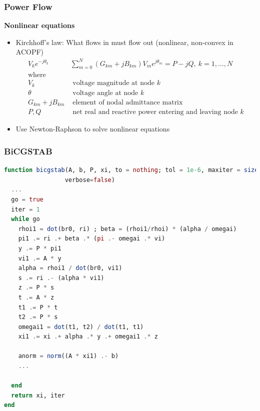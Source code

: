 \begin{frame}[fragile]
  \frametitle{Power Flow}
  {\bf Nonlinear equations}
  \begin{itemize}
      \item Kirchhoff's law: What flows in must flow out (nonlinear, non-convex in ACOPF)
      \begin{align*}
        V_k e^{-j\theta_k} & \sum^{N}_{m=0} (G_{km} + jB_{km})V_m e^{j\theta_m} = P - jQ,\ k = 1, \dots, N \\
        \text{where}\\
        V_k &\text{ voltage magnitude at node } k\\
        \theta &\text{ voltage angle at node } k\\
        G_{km} + jB_{km}& \text{ element of nodal admittance matrix}\\
        P, Q &\text{ net real and reactive power entering and leaving node } k
      \end{align*}
      \item Use Newton-Raphson to solve nonlinear equations
  \end{itemize}
\end{frame}


\begin{frame}[fragile]
  \frametitle{BiCGSTAB}
  \begin{lstlisting}[language=julia, style=jlcodestyle]
function bicgstab(A, b, P, xi, to = nothing; tol = 1e-6, maxiter = size(A,1),
                 verbose=false)
  ...
  go = true
  iter = 1
  while go
    rhoi1 = dot(br0, ri) ; beta = (rhoi1/rhoi) * (alpha / omegai)
    pi1 .= ri .+ beta .* (pi .- omegai .* vi)
    y .= P * pi1
    vi1 .= A * y
    alpha = rhoi1 / dot(br0, vi1)
    s .= ri .- (alpha * vi1)
    z .= P * s
    t .= A * z
    t1 .= P * t
    t2 .= P * s
    omegai1 = dot(t1, t2) / dot(t1, t1)
    xi1 .= xi .+ alpha .* y .+ omegai1 .* z
  
    anorm = norm((A * xi1) .- b)
    ...

  end
  return xi, iter
end
  \end{lstlisting}
\end{frame}


